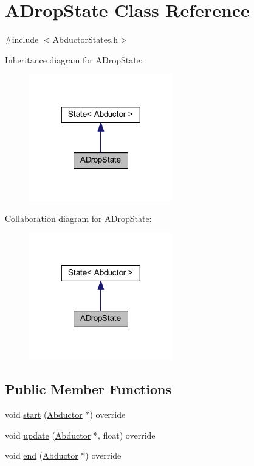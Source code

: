\hypertarget{class_a_drop_state}{}\section{A\+Drop\+State Class Reference}
\label{class_a_drop_state}


{\ttfamily \#include $<$Abductor\+States.\+h$>$}



Inheritance diagram for A\+Drop\+State\+:\nopagebreak
\begin{figure}[H]
\begin{center}
\leavevmode
\includegraphics[width=177pt]{class_a_drop_state__inherit__graph}
\end{center}
\end{figure}


Collaboration diagram for A\+Drop\+State\+:\nopagebreak
\begin{figure}[H]
\begin{center}
\leavevmode
\includegraphics[width=177pt]{class_a_drop_state__coll__graph}
\end{center}
\end{figure}
\subsection*{Public Member Functions}
\begin{DoxyCompactItemize}
\item 
void \hyperlink{class_a_drop_state_ab41abe3006ca9d4dec5e93a800a03e01}{start} (\hyperlink{class_abductor}{Abductor} $\ast$) override
\item 
void \hyperlink{class_a_drop_state_a50ee2cafa31714ee14223e6cce007f08}{update} (\hyperlink{class_abductor}{Abductor} $\ast$, float) override
\item 
void \hyperlink{class_a_drop_state_a6af566dd1e06d425f16a69bbd11e811f}{end} (\hyperlink{class_abductor}{Abductor} $\ast$) override
\end{DoxyCompactItemize}
